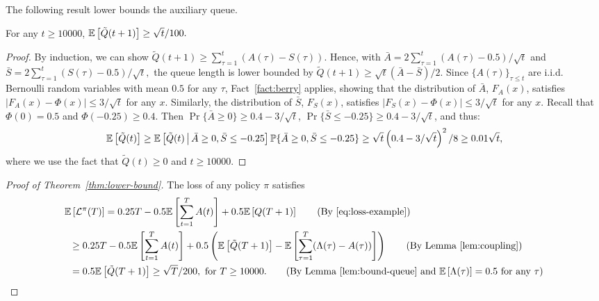 The following result lower bounds the auxiliary queue.
\begin{lemma}\label{lem:bound-queue}
For any $t \geq 10000$, $\mathbb E\left[\tilde{Q}(t + 1)\right] \geq \sqrt{t}/100.$\end{lemma}
\begin{proof}
By induction, we can show $\tilde{Q}(t+1) \geq \sum_{\tau=1}^t (A(\tau) - S(\tau))$. Hence, with $\bar{A} = 2\sum_{\tau=1}^t (A(\tau)-0.5) / \sqrt{t}$ and $\bar{S} = 2\sum_{\tau=1}^t (S(\tau)-0.5)/ \sqrt{t},$ the queue length is lower bounded by $\tilde{Q}(t + 1) \geq \sqrt{t}(\bar{A} - \bar{S}) / 2$. Since $\{A(\tau)\}_{\tau \leq t}$ are i.i.d. Bernoulli random variables with mean $0.5$ for any $\tau$, Fact~\ref{fact:berry} applies, showing that the distribution of $\bar{A}$, $F_A(x)$, satisfies $|F_A(x) - \Phi(x)| \leq 3 / \sqrt{t}$ for any $x$. Similarly, the distribution of $\bar{S}$, $F_S(x)$, satisfies $|F_S(x) - \Phi(x)| \leq 3/\sqrt{t}$ for any $x$. Recall that $\Phi(0) = 0.5$ and $\Phi(-0.25) \geq 0.4.$ Then $\Pr\{\bar{A} \geq 0\} \geq 0.4 - 3/\sqrt{t}$, $\Pr\{\bar{S} \leq -0.25\} \geq 0.4 - 3/\sqrt{t}$, and thus:
\[
\mathbb E\left[\tilde{Q}(t)\right] \geq \mathbb E\left[\tilde{Q}(t) \,\middle\vert\, \bar{A} \geq 0, \bar{S} \leq -0.25\right] \mathbb{P}\{\bar{A} \geq 0, \bar{S} \leq -0.25\} \geq \sqrt{t}\left(0.4-3/\sqrt{t}\right)^2 / 8 \geq 0.01\sqrt{t}, 
\]
where we use the fact that $\tilde{Q}(t) \geq 0$ and $t \geq 10000.$
\end{proof}
\begin{proof}[Proof of Theorem~\ref{thm:lower-bound}]
The loss of any policy $\pi$ satisfies
\begin{align*}
\expect{\set{L}^{\pi}(T)} &= 0.25T - 0.5\expect{\sum_{t=1}^T A(t)} + 0.5\expect{Q(T+1)} \tag{By \eqref{eq:loss-example}} \\
&\hspace{-0.5in}\geq 0.25T - 0.5\expect{\sum_{t=1}^T A(t)} + 0.5\left(\expect{\tilde{Q}(T+1)} - \expect{\sum_{\tau=1}^T (\Lambda(\tau) - A(\tau))}\right) \tag{By Lemma~\ref{lem:coupling}} \\
&\hspace{-0.5in}= 0.5\expect{\tilde{Q}(T+1)} \geq \sqrt{T} / 200,~\text{for $T \geq 10000$.} \tag{By Lemma~\ref{lem:bound-queue} and $\expect{\Lambda(\tau)} = 0.5$ for any $\tau$}
\end{align*}
\end{proof}

